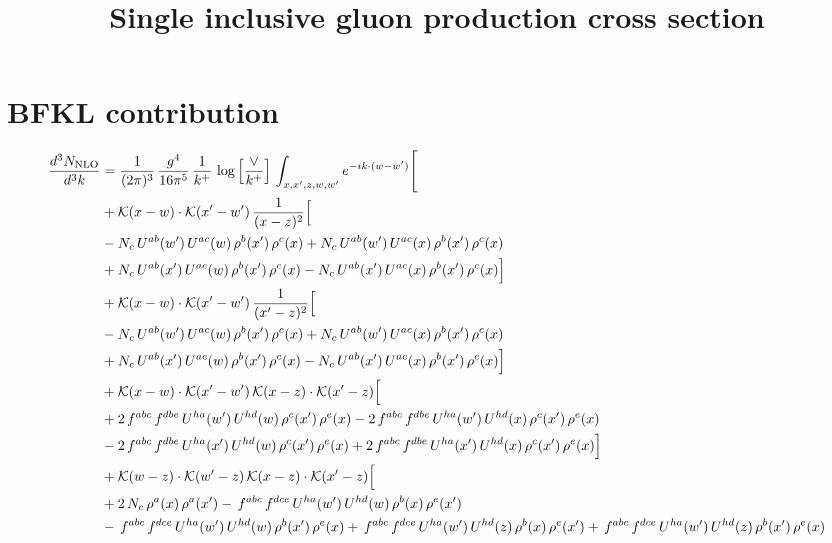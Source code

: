 \documentclass[9pt]{article}
\title{Single inclusive gluon production cross section}
\author{}
\date{}
\numberwithin{equation}{section}
\begin{document}
\maketitle
\section{BFKL contribution}
\begin{align}
\frac{d^{3}N_{\mathrm{NLO}}}{d^{3}k} & = \frac{1}{(2\pi)^{3}}\,\frac{g^{4}}{16\pi^{5}}\,\frac{1}{k^{+}}\,\log\Big[\frac{\vee}{k^{+}}\Big]\,\int_{x,x',z,w,w'}e^{-ik\cdot(w-w')}\Bigg[ \notag\\
& +\mathcal{K}(x-w)\cdot\mathcal{K}(x'-w')\,\frac{1}{(x-z)^{2}}\Big[\notag\\
& -N_{c}\,U^{ab}(w')\,U^{ac}(w)\,\rho^{b}(x')\,\rho^{c}(x) +N_{c}\,U^{ab}(w')\,U^{ac}(x)\,\rho^{b}(x')\,\rho^{c}(x)\notag\\
& +N_{c}\,U^{ab}(x')\,U^{ac}(w)\,\rho^{b}(x')\,\rho^{c}(x) -N_{c}\,U^{ab}(x')\,U^{ac}(x)\,\rho^{b}(x')\,\rho^{c}(x)\Big]\notag\\
& +\mathcal{K}(x-w)\cdot\mathcal{K}(x'-w')\,\frac{1}{(x'-z)^{2}}\Big[\notag\\
& -N_{c}\,U^{ab}(w')\,U^{ac}(w)\,\rho^{b}(x')\,\rho^{c}(x) +N_{c}\,U^{ab}(w')\,U^{ac}(x)\,\rho^{b}(x')\,\rho^{c}(x)\notag\\
& +N_{c}\,U^{ab}(x')\,U^{ac}(w)\,\rho^{b}(x')\,\rho^{c}(x) -N_{c}\,U^{ab}(x')\,U^{ac}(x)\,\rho^{b}(x')\,\rho^{c}(x)\Big]\notag\\
& +\mathcal{K}(x-w)\cdot\mathcal{K}(x'-w')\,\mathcal{K}(x-z)\cdot\mathcal{K}(x'-z)\Big[\notag\\
& +2\,f^{abc}\,f^{dbe}\,U^{ha}(w')\,U^{hd}(w)\,\rho^{c}(x')\,\rho^{e}(x) -2\,f^{abc}\,f^{dbe}\,U^{ha}(w')\,U^{hd}(x)\,\rho^{c}(x')\,\rho^{e}(x)\notag\\
& -2\,f^{abc}\,f^{dbe}\,U^{ha}(x')\,U^{hd}(w)\,\rho^{c}(x')\,\rho^{e}(x) +2\,f^{abc}\,f^{dbe}\,U^{ha}(x')\,U^{hd}(x)\,\rho^{c}(x')\,\rho^{e}(x)\Big]\notag\\
& +\mathcal{K}(w-z)\cdot\mathcal{K}(w'-z)\,\mathcal{K}(x-z)\cdot\mathcal{K}(x'-z)\Big[\notag\\
& +2\,N_{c}\,\rho^{a}(x)\,\rho^{a}(x') -\,f^{abc}\,f^{dce}\,U^{ha}(w')\,U^{hd}(w)\,\rho^{b}(x)\,\rho^{e}(x')\notag\\
& -\,f^{abc}\,f^{dce}\,U^{ha}(w')\,U^{hd}(w)\,\rho^{b}(x')\,\rho^{e}(x) +\,f^{abc}\,f^{dce}\,U^{ha}(w')\,U^{hd}(z)\,\rho^{b}(x)\,\rho^{e}(x') +\,f^{abc}\,f^{dce}\,U^{ha}(w')\,U^{hd}(z)\,\rho^{b}(x')\,\rho^{e}(x)\notag\\

\end{align}
\end{document}

